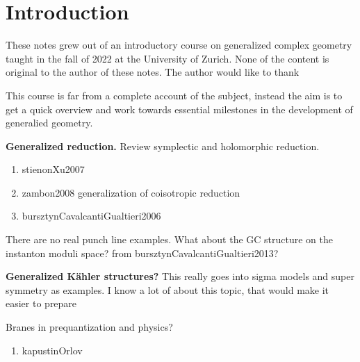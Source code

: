 \documentclass{tufte-book}
\newcounter{example}[section]
\begin{document}
\tableofcontents








\chapter*{Introduction}


These notes grew out of an introductory course on generalized complex geometry taught
in the fall of 2022 at the University of Zurich. None of the content is original to the
author of these notes. The author would like to thank 

\lb
This course is far from a complete account of the subject, instead the aim is to
get a quick overview and work towards essential milestones in the development of generalied
geometry.


\lb
{\bf Generalized reduction.}
Review symplectic and holomorphic reduction.
\begin{enumerate}
    \item stienonXu2007
    \item zambon2008 generalization of coisotropic reduction
    \item bursztynCavalcantiGualtieri2006
\end{enumerate}
There are no real punch line examples. What about the GC structure on the instanton moduli
space? from bursztynCavalcantiGualtieri2013?



\lb
{\bf Generalized Kähler structures?}
This really goes into sigma models and super symmetry as examples.
I know a lot of about this topic, that would make it easier to prepare


\lb
Branes in prequantization and physics?
\begin{enumerate}
    \item kapustinOrlov
\end{enumerate}
\end{document}
